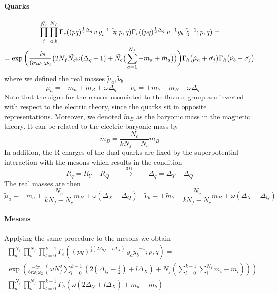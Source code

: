 \paragraph{Quarks}
\begin{multline}
 \prod_{ j }^{\tilde{N_c}} \prod_{ a,b }^{N_f}  \Gamma_e ( (pq)^{{1 \over 2 } \Delta_q} \, \tilde{v} \, y_i^{-1} \tilde{\tilde{z}_j} ; p,q)\Gamma_e ( (pq)^{{1 \over 2 } \Delta_q} \, \tilde{v}^{-1} \tilde y_b \tilde{\tilde{z}_j}^{-1} ; p,q)  = \\
  =   \exp \bigg( \frac{- i \pi }{6 r \omega_1 \omega_2} \big( 2  N_f \tilde{N_c}\omega (\Delta_q - 1 ) +  \tilde{N_c} \big( \sum_{a=1}^{N_f} - m_a + \tilde{m}_a \big)  \big) \bigg)  \Gamma_h \big(\tilde{ \mu}_a + \tilde{\sigma_j} \big) \Gamma_h \big( \tilde{\nu}_b - \tilde{\sigma_j} \big)
\end{multline}
where we defined the real masses $\tilde{\mu}_a,\tilde{\nu}_b$
\begin{equation}
\tilde{\mu}_a = - m_a + \tilde{m}_B + \omega \Delta_q \qquad 
\tilde{\nu}_b = + \tilde{m}_b - \tilde{m}_B + \omega \Delta_q \qquad 
\end{equation}
Note that the signs for the masses associated to the flavour group are inverted with respect to the electric theory, since the quarks sit in opposite representations.
Moreover, we denoted $\tilde{m}_B$ as the baryonic mass in the magnetic theory.
It can be related to the electric baryonic mass by
\begin{equation}
 \tilde{m}_B = \frac{N_c}{k N_f - N_c} m_B
 \end{equation} 
In addition, the R-charges of the dual quarks are fixed by the superpotential interaction with the mesons which results in the condition
\begin{equation}
R_q = R_Y - R_Q \qquad \overset{3D}{\longrightarrow} \qquad \Delta_q = \Delta_Y - \Delta_Q
\end{equation}
The real masses are then
\begin{equation}
\tilde{\mu}_a = - m_a + \frac{N_c}{k N_f - N_c} m_B + \omega (\Delta_X - \Delta_Q) \quad 
\tilde{\nu}_b = + \tilde{m}_b - \frac{N_c}{k N_f - N_c} m_B + \omega (\Delta_X - \Delta_Q)
\end{equation}




\paragraph{Mesons}
Applying the same procedure to the mesons we obtain
\begin{multline}
\prod_a^{N_f} \prod_b^{N_f}  \prod_{l=0}^{k-1} \Gamma_e ( (pq)^{\frac{1}{2}\left( 2 \Delta_Q + l\Delta_X\right)} \, y_a \tilde{y_b}^{-1}; p ,q)  = \\
\exp \left( \frac{- i \pi }{6 r \omega_1 \omega_2} \left(  \omega  N_f^2 \sum _{l=0}^{k-1} \left(  2 \left( \Delta_Q - \frac{1}{2}\right) +  l \Delta_X   \right)  +N_f \left( \sum_{l=0}^{k-1} \sum_i^{N_f} m_i - \tilde{m_i}\right) \right) \right) \\
 \prod_a^{N_f} \prod_b^{N_f}  \prod_{l=0}^{k-1}  \Gamma_h \left( \omega ( 2 \Delta_Q + l \Delta_X) + m_a - \tilde{m_b} \right)
\end{multline}

